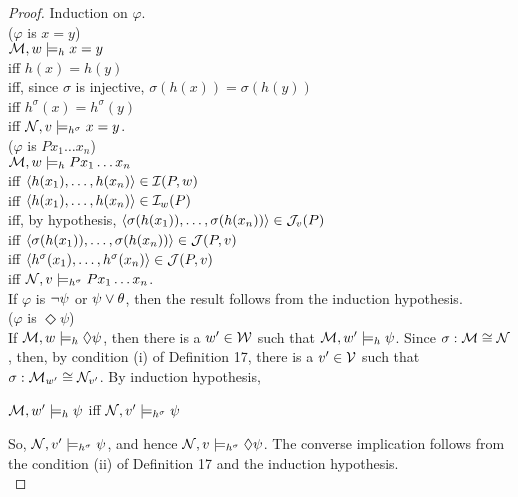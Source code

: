 \begin{proof}
Induction on $\varphi$. \\




($\varphi$ is $x=y$)\\

$\mathcal{M},w \models_{h} x = y$ \\
iff $h(x) = h(y)$\\
iff, since $\sigma$ is injective, $\sigma(h(x)) = \sigma(h(y))$\\
iff $h^{\sigma}(x) = h^{\sigma}(y)$\\
iff  $\mathcal{N},v \models_{h^{\sigma}} x = y$.\\



($\varphi$ is $Px_{1}\dots x_{n}$)\\

$\mathcal{M},w \models_{h} Px_{1}\dots x_{n}$\\
iff $\langle h(x_{1}), \dots, h(x_{n})\rangle \in \mathcal{I}(P,w)$\\
iff $\langle h(x_{1}), \dots, h(x_{n}) \rangle \in \mathcal{I}_{w}(P)$\\
iff, by hypothesis,  $\langle \sigma(h(x_{1})), \dots, \sigma(h(x_{n})) \rangle \in \mathcal{J}_{v}(P)$\\
iff $\langle \sigma(h(x_{1})), \dots, \sigma(h(x_{n})) \rangle \in \mathcal{J}(P,v)$\\
iff $\langle h^{\sigma}(x_{1}), \dots, h^{\sigma}(x_{n}) \rangle \in \mathcal{J}(P,v)$\\
iff  $\mathcal{N},v \models_{h^{\sigma}} Px_{1}\dots x_{n}$.\\

\qquad If $\varphi$ is $\neg \psi$ or $\psi \vee \theta$, then the result follows from the induction hypothesis.\\



($\varphi$ is $\Diamond \psi$)\\

\qquad If $\mathcal{M},w \models_{h} \Diamond \psi$, then there is a $w^{\prime} \in \mathcal{W}$ such that $\mathcal{M},w^{\prime} \models_{h} \psi$. Since $\sigma: \mathcal{M} \cong \mathcal{N}$, then, by condition (i) of Definition 17, there is a $v^{\prime} \in \mathcal{V}$ such that $\sigma: \mathcal{M}_{w^{\prime}} \cong \mathcal{N}_{v^{\prime}}$. By induction hypothesis,

\begin{center}
$\mathcal{M},w^{\prime} \models_{h} \psi$ iff $\mathcal{N},v^{\prime} \models_{h^{\sigma}} \psi$ 
\end{center}

\qquad So, $\mathcal{N},v^{\prime} \models_{h^{\sigma}} \psi$, and hence $\mathcal{N},v \models_{h^{\sigma}} \Diamond\psi$. The converse implication follows from the condition (ii) of Definition 17 and the induction hypothesis.\\



\end{proof}
